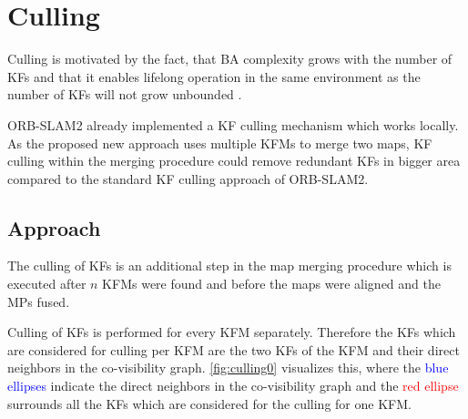 \chapter{Culling}
\label{sec:culling}

Culling is motivated by the fact, that \ac{BA} complexity grows with the number of \acp{KF} and that it enables lifelong operation in the same environment as the number of \acp{KF} will not grow unbounded \cite{Mur-Artal2015}.

ORB-SLAM2 already implemented a \ac{KF} culling mechanism which works locally. As the proposed new approach uses multiple \acp{KFM} to merge two maps, \ac{KF} culling within the merging procedure could remove redundant \acp{KF} in bigger area compared to the standard \ac{KF} culling approach of ORB-SLAM2.

\section{Approach}

The culling of \acp{KF} is an additional step in the map merging procedure which is executed after $n$ \acp{KFM} were found and before the maps were aligned and the \acp{MP} fused.

Culling of \acp{KF} is performed for every \ac{KFM} separately. Therefore the \acp{KF} which are considered for culling per \ac{KFM} are the two \acp{KF} of the \ac{KFM} and their direct neighbors in the co-visibility graph. \autoref{fig:culling0} visualizes this, where the \textcolor{blue}{blue ellipses} indicate the direct neighbors in the co-visibility graph and the \textcolor{red}{red ellipse} surrounds all the \acp{KF} which are considered for the culling for one \ac{KFM}.

